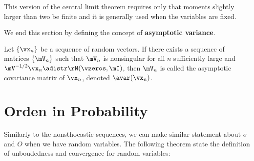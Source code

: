 This version of the central limit theorem requires only that moments slightly larger than two be finite and it is generally used when the variables are fixed. 

We end this section by defining the concept of \textbf{asymptotic variance}.


\begin{definition}\label{def:asymptotic_variance}
Let $\left\lbrace\vx_n\right\rbrace$ be a sequence of random vectors. If there exists a sequence of matrices $\left\lbrace \mV_n\right\rbrace$ such that $\mV_n$ is nonsingular for all $n$ sufficiently large and $\mV^
{-1/2}\vx_n \adistr \rN(\vzeros, \mI)$, then $\mV_n$ is called the asymptotic covariance matrix of $\vx_n$, denoted $\avar(\vx_n)$.
\end{definition}


\section{Orden in Probability}


Similarly to the nonsthocastic sequences, we can make similar statement about $o$ and $O$ when we have random variables. The following theorem state the definition of unboudedness and convergence for random variables: 

